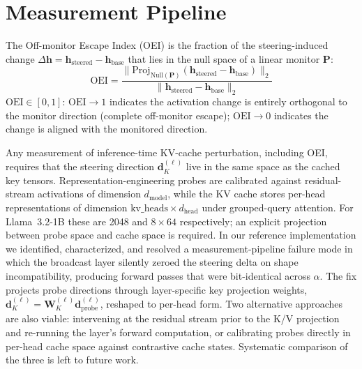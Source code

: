 \section{Measurement Pipeline}\label{sec:measurement-prereqs}

The Off-monitor Escape Index (OEI) is the fraction of the steering-induced change $\Delta\mathbf{h} = \mathbf{h}_{\text{steered}} - \mathbf{h}_{\text{base}}$ that lies in the null space of a linear monitor $\mathbf{P}$:
\begin{equation}
\text{OEI} = \frac{\|\text{Proj}_{\text{Null}(\mathbf{P})}(\mathbf{h}_{\text{steered}} - \mathbf{h}_{\text{base}})\|_2}{\|\mathbf{h}_{\text{steered}} - \mathbf{h}_{\text{base}}\|_2}
\label{eq:oei}
\end{equation}
$\text{OEI} \in [0, 1]$: $\text{OEI} \to 1$ indicates the activation change is entirely orthogonal to the monitor direction (complete off-monitor escape); $\text{OEI} \to 0$ indicates the change is aligned with the monitored direction.

Any measurement of inference-time KV-cache perturbation, including OEI, requires that the steering direction $\mathbf{d}_K^{(\ell)}$ live in the same space as the cached key tensors. Representation-engineering probes are calibrated against residual-stream activations of dimension $d_{\text{model}}$, while the KV cache stores per-head representations of dimension $\text{kv\_heads} \times d_{\text{head}}$ under grouped-query attention. For Llama~3.2-1B these are 2048 and $8 \times 64$ respectively; an explicit projection between probe space and cache space is required. In our reference implementation we identified, characterized, and resolved a measurement-pipeline failure mode in which the broadcast layer silently zeroed the steering delta on shape incompatibility, producing forward passes that were bit-identical across $\alpha$. The fix projects probe directions through layer-specific key projection weights, $\mathbf{d}_K^{(\ell)} = \mathbf{W}_K^{(\ell)} \mathbf{d}_{\text{probe}}^{(\ell)}$, reshaped to per-head form. Two alternative approaches are also viable: intervening at the residual stream prior to the K/V projection and re-running the layer's forward computation, or calibrating probes directly in per-head cache space against contrastive cache states. Systematic comparison of the three is left to future work.

